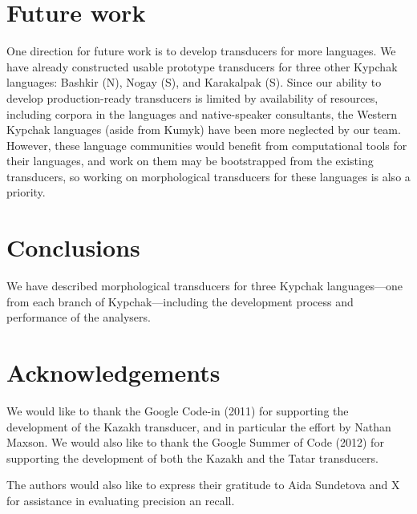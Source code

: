 \documentclass[a4paper,11pt,twocolumn]{article}
\begin{document}
\section{Future work}


One direction for future work is to develop transducers for more languages.  We have already constructed usable prototype transducers for three other Kypchak languages: Bashkir (N), Nogay (S), and Karakalpak (S).  Since our ability to develop production-ready transducers is limited by availability of resources, including corpora in the languages and native-speaker consultants, the Western Kypchak languages (aside from Kumyk) have been more neglected by our team.  However, these language communities would benefit from computational tools for their languages, and work on them may be bootstrapped from the existing transducers, so working on morphological transducers for these languages is also a priority.

\section{Conclusions}

We have described morphological transducers for three Kypchak languages---one from each branch of Kypchak---including the development process and performance of the analysers.

\section*{Acknowledgements}

We would like to thank the Google Code-in (2011) for supporting the development 
of the Kazakh transducer, and in particular the effort by Nathan Maxson. We 
would also like to thank the Google Summer of Code (2012) for supporting the 
development of both the Kazakh and the Tatar transducers. 

The authors would also like to express their gratitude to Aida Sundetova and X 
for assistance in evaluating precision an recall.



\end{document}
